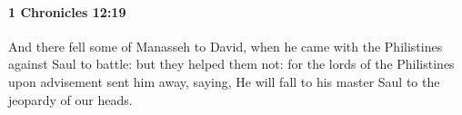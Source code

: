 
		\paragraph{1 Chronicles 12:19} %
			\label{1CHRONICLES-12-19}

			And there fell some of Manasseh to David, when he came with the Philistines against Saul to battle: but they helped them not: for the lords of the Philistines upon advisement sent him away, saying, He will fall to his master Saul to the jeopardy of our heads.


